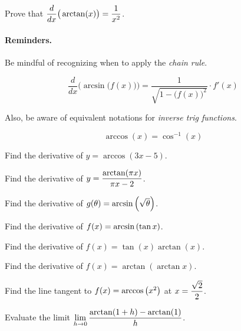 \documentclass[12pt]{article}
\begin{document}
\vspace{3mm}

\Example Prove that $\displaystyle\frac{d}{dx}\big(\arctan(x)\big)=\frac{1}{x^2}$.

\newpage

\paragraph{Reminders.} Be mindful of recognizing when to apply the \textit{chain rule}.

$$\frac{d}{dx}\Big(\arcsin\big(f(x)\big)\Big)=\frac{1}{\sqrt{1-\big(f(x)\big)^2}}\cdot f'(x)$$

\vspace{3mm}

Also, be aware of equivalent notations for \textit{inverse trig functions}.

$$\arccos(x)=\cos^{-1}(x)$$

\vspace{5mm}

\Example Find the derivative of $y=\arccos(3x-5)$.

\vspace{40mm}

\Example Find the derivative of $y=\displaystyle\frac{\arctan(\pi x)}{\pi x-2}$.

\vspace{40mm}

\Example Find the derivative of $g(\theta)=\arcsin\left(\sqrt{\theta}\right)$.

\newpage

\Example Find the derivative of $f(x)=\arcsin\left(\tan x\right)$.

\vspace{60mm}

\Example Find the derivative of $f(x)=\tan(x)\arctan(x)$.

\vspace{60mm}

\Example Find the derivative of $f(x)=\arctan(\arctan x)$.

\newpage

\Example Find the line tangent to $f(x)=\arccos\left( x^2\right)$ at $x=\displaystyle\frac{\sqrt{2}}{2}$.


\vspace{100mm} 

\Example Evaluate the limit $\displaystyle\lim_{h\to 0}\frac{\arctan(1+h)-\arctan(1)}{h}$.
\end{document}

